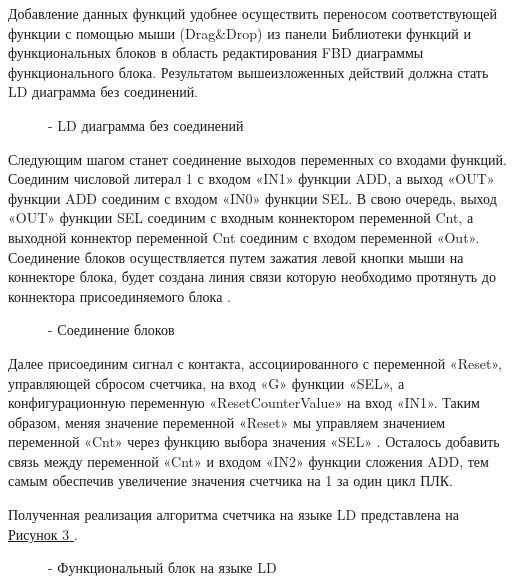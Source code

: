 \documentclass[letterpaper,10pt,russian]{sphinxmanual}
\begin{document}
Добавление данных функций удобнее осуществить переносом соответствующей
функции с помощью мыши (Drag\&Drop) из панели Библиотеки функций и
функциональных блоков в область редактирования FBD диаграммы
функционального блока. Результатом вышеизложенных действий должна стать
LD диаграмма без соединений.
\begin{figure}[htbp]
\centering
\capstart

\noindent{}
\caption{- LD диаграмма без соединений}\label{usage_guide/work_with_project:image186}\end{figure}

Следующим шагом станет соединение выходов переменных со входами функций.
Соединим числовой литерал 1 с входом «IN1» функции ADD, а выход «OUT»
функции ADD соединим с входом «IN0» функции SEL. В свою очередь, выход
«OUT» функции SEL соединим с входным коннектором переменной Cnt, а
выходной коннектор переменной Cnt соединим с входом переменной «Out».
Соединение блоков осуществляется путем зажатия левой кнопки мыши на
коннекторе блока, будет создана линия связи которую необходимо протянуть
до коннектора присоединяемого блока .
\begin{figure}[htbp]
\centering
\capstart

\noindent{}
\caption{- Соединение блоков}\label{usage_guide/work_with_project:image187}\end{figure}

Далее присоединим сигнал с контакта, ассоциированного с переменной
«Reset», управляющей сбросом счетчика, на вход «G» функции «SEL», а
конфигурационную переменную «ResetCounterValue» на вход «IN1». Таким
образом, меняя значение переменной «Reset» мы управляем значением
переменной «Cnt» через функцию выбора значения «SEL» . Осталось добавить
связь между переменной «Cnt» и входом «IN2» функции сложения ADD, тем
самым обеспечив увеличение значения счетчика на 1 за один цикл ПЛК.

Полученная реализация алгоритма счетчика на языке LD представлена
на \hyperref[usage_guide/work_with_project:image188]{Рисунок \ref{usage_guide/work_with_project:image188} }.
\begin{figure}[htbp]
\centering
\capstart

\noindent{}
\caption{- Функциональный блок на языке LD}\label{usage_guide/work_with_project:image188}\end{figure}
\end{document}
